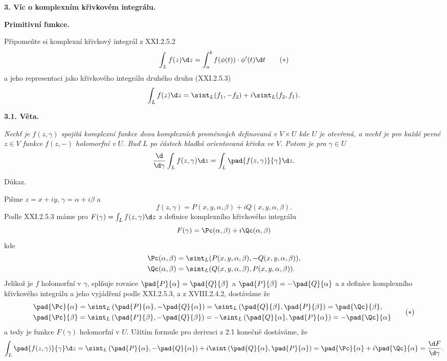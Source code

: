 \documentclass[12pt]{article}
\begin{document}
 {\large\bf 3. Víc o komplexním křivkovém integrálu.}

\medskip

{\large\bf \hskip7mm Primitivní funkce.}

\bigskip

Připomeňte si komplexní křivkový integrál z XXI.2.5.2
\begin{equation}
\int_Lf(z)\d z=\int_a^bf(\phi(t))\cdot\phi'(t)\d t \tag{$*$}
\end{equation}
a jeho representaci jako křivkového integrálu druhého druhu (XXI.2.5.3)
$$
\int_Lf(z)\d z=\sint_L(f_1,-f_2)+i\sint_L(f_2,f_1).
$$

\bigskip

{\bf 3.1. Věta.} {\em Nechť je $f(z,\gamma)$ spojitá komplexní funkce dvou komplexních proměnných definovaná v $V\times U$ kde $U$ je otevřená, a nechť je pro každé pevné
$z\in V$ funkce $f(z,-)$  holomorfní v $U$. Buď $L$ po částech hladká orientovaná křivka ve
$V$. Potom je pro $\gamma\in U$
$$
\frac{\d}{\d \gamma}\int_Lf(z,\gamma)\d z=\int_L\pad{f(z,\gamma)}{\gamma}\d z.
$$

Důkaz.} Pišme $z=x+iy$, $\gamma=\alpha+i\beta$ a
$$
f(z,\gamma)=P(x,y,\alpha,\beta)+iQ(x,y,\alpha,\beta).
$$
Podle XXI.2.5.3 máme pro $F(\gamma)
=\int_Lf(z,\gamma)\d z$ z definice komplexního křivkového integrálu
$$
F(\gamma)=\Pc(\alpha,\beta)+i\Qc(\alpha,\beta)
$$
kde
$$
\begin{aligned}
&\Pc(\alpha,\beta)=\sint_L(P(x,y,\alpha,\beta),-Q(x,y,\alpha,\beta)),\\
&\Qc(\alpha,\beta)=\sint_L(Q(x,y,\alpha,\beta),P(x,y,\alpha,\beta)).
\end{aligned}
$$
Jelikož je $f$ holomorfní v $\gamma$, splňuje rovnice
$\pad{P}{\alpha}=\pad{Q}{\beta}$ a $\pad{P}{\beta}=-\pad{Q}{\alpha}$
a z definice komplexního křivkového integrálu
a jeho vyjádření podle XXI.2.5.3, a z
XVIII.2.4.2, dostáváme že
\begin{equation}
\begin{aligned}
&\pad{\Pc}{\alpha}=\sint_L\left(\pad{P}{\alpha},-\pad{Q}{\alpha}\right)=
                    \sint_L\left(\pad{Q}{\beta},\pad{P}{\beta}\right)=\pad{\Qc}{\beta},\\
&\pad{\Pc}{\beta}=\sint_L\left(\pad{P}{\beta},-\pad{Q}{\beta}\right)=
                   - \sint_L\left(\pad{Q}{\alpha},\pad{P}{\alpha}\right)=-\pad{\Qc}{\alpha}
\end{aligned}  \tag{$*$}
\end{equation}
a tedy je funkce  $F(\gamma)$ holomorfní v $U$. Užitím formule pro derivaci z 2.1 konečně dostáváme, že
$$
\int_L\pad{f(z,\gamma)}{\gamma}\d z=
\sint_L\left(\pad{P}{\alpha},-\pad{Q}{\alpha}\right)+i\sint\left(\pad{Q}{\alpha},\pad{P}{\alpha}\right)=
\pad{\Pc}{\alpha}+i\pad{\Qc}{\alpha}=\frac{\d F}{\d \gamma}.
$$ \sq
\bigskip
\end{document}
